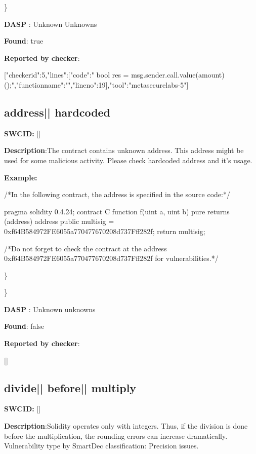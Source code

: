 \documentclass{article}
\begin{document}
\} 

\textbf{DASP} : Unknown Unknowns

\textbf{Found}: true

\textbf{Reported by checker}: 
\begin{ffcode} 

[{"checker\textunderscore id":5,"lines":[{"code":"      bool res = msg.sender.call.value(amount)();\n","function\textunderscore name":"","line\textunderscore no":19}],"tool":"metasecurelabs-5"}]
\end{ffcode} 
\subsection{address{|\textunderscore| }hardcoded} 
\textbf{SWC{\textunderscore }ID:} []

\textbf{Description}:The contract contains unknown address. This address might be used for some malicious activity. Please check hardcoded address and it's usage.


\textbf{Example:} 
\begin{ffcode} 

/*In the following contract, the address is specified in the source code:*/ 

pragma solidity 0.4.24;
contract C {
  function f(uint a, uint b) pure returns (address) {
    address public multisig = 0xf64B584972FE6055a770477670208d737Fff282f;
    return multisig;
        }
}

 /*Do not forget to check the contract at the address 0xf64B584972FE6055a770477670208d737Fff282f for vulnerabilities.*/ 

\end{ffcode} 
\} 

\} 

\textbf{DASP} : Unknown unknowns

\textbf{Found}: false

\textbf{Reported by checker}: 
\begin{ffcode} 

[]
\end{ffcode} 
\subsection{divide{|\textunderscore| }before{|\textunderscore| }multiply} 
\textbf{SWC{\textunderscore }ID:} []

\textbf{Description}:Solidity operates only with integers. Thus, if the division is done before the multiplication, the rounding errors can increase dramatically. Vulnerability type by SmartDec classification: Precision issues.
\end{document}
